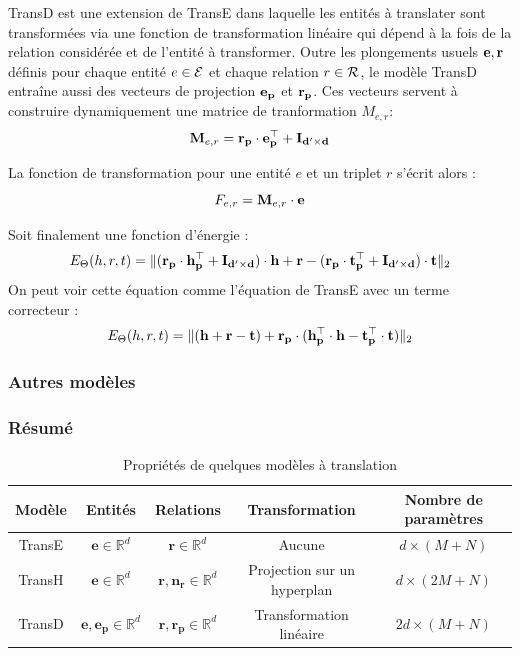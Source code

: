 TransD est une extension de TransE dans laquelle les entités à translater sont transformées via une fonction de transformation linéaire qui dépend à la fois de la relation considérée et de l'entité à transformer. Outre les plongements usuels $\bf{e}, \bf{r}$ définis pour chaque entité $e \in \Ent $ et chaque relation $r \in \Rel$, le modèle TransD entraîne aussi des vecteurs de projection $\bf{e_p}$ et $\bf{r_p}$. Ces vecteurs servent à construire dynamiquement une matrice de tranformation $M_{e, r}$:
\begin{equation}
    \label{eq:kge-transd-matrix}
    \bf{M}_{e, r} = \bf{r_p \cdot e_p^\top + I_{d' \times d}}
\end{equation}

La fonction de transformation pour une entité $e$ et un triplet $r$ s'écrit alors :
\begin{equation}
    \label{eq:kge-transd-function}
    F_{e, r} = \bf{M}_{e, r} \cdot \bf{e}
\end{equation}

Soit finalement une fonction d'énergie :
\begin{equation}
    E_\Theta(h, r, t) = \| (\bf{r_p \cdot h_p^\top + I_{d' \times d}}) \cdot \bf{h} + \mathbf{r} - (\bf{r_p \cdot t_p^\top + I_{d' \times d}}) \cdot \bf{t} \|_2 
\end{equation}
On peut voir cette équation comme l'équation de TransE avec un terme correcteur :
\begin{equation}
    E_\Theta(h, r, t) = \| (\bf{h + r - t}) + \bf{r_p} \cdot (\bf{ h_p^\top \cdot h - t_p^\top \cdot t}) \|_2 
\end{equation}


\subsubsection{Autres modèles}

\subsubsection{Résumé}


\begin{table}[ht]
\caption{Propriétés de quelques modèles à translation}
\centering
\begin{tabular}{|c|c|c|c|c|}
\hline\rowcolor[gray]{0.8}\color{black}
Modèle & Entités & Relations & Transformation & Nombre de paramètres\\\hline
TransE & $\mathbf{e} \in \mathbb{R}^d$ & $\mathbf{r} \in \mathbb{R}^d$ & Aucune & $d \times (M + N)$ \\
TransH & $\mathbf{e} \in \mathbb{R}^d$ & $\mathbf{r, n_r} \in \mathbb{R}^d$ & Projection sur un hyperplan & $d \times (2M + N)$ \\
TransD & $\mathbf{e, e_p} \in \mathbb{R}^d$ & $\mathbf{r, r_p} \in \mathbb{R}^d$  & Transformation linéaire & $2d \times (M + N)$ \\\hline
\end{tabular}
\label{tab:transx}
\end{table}

